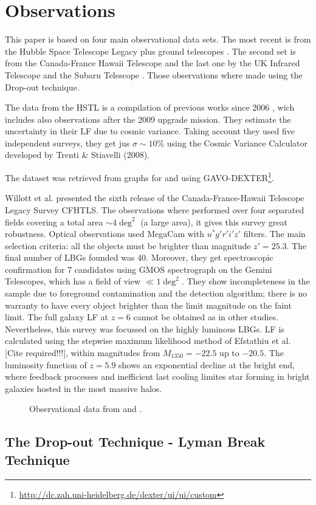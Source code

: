 \section{Observations}

This paper is based on four main observational data sets. The most recent is
from the Hubble Space Telescope Legacy plus ground telescopes \citep{bouwens14}.
The second set is from the Canada-France Hawaii Telescope\citep{willott13} and
the last one by the UK Infrared Telescope and the Subaru Telescope
\cite{mclure09}. Those observations where made using the Drop-out technique.

The data from the HSTL is a compilation of previous works since
2006 \citep{bouwens06}, wich includes also observations after the 2009
upgrade mission\citep{bouwens12}. They estimate the uncertainty in their LF due
to cosmic variance. Taking account they used five independent surveys, they get
jus $\sigma\sim 10\%$\citep{bouwens14} using the Cosmic Variance Calculator
developed by Trenti \& Stiavelli (2008).



The dataset was retrieved from graphs for \cite{bouwens14} and \cite{mclure09} 
using
GAVO-DEXTER\footnote{\url{http://dc.zah.uni-heidelberg.de/dexter/ui/ui/custom}}.




Willott et al. \cite{willott13} presented the sixth release of the Canada-France-Hawaii Telescope Legacy Survey CFHTLS. The observations where performed over four separated fields covering a total area $\sim 4 \deg^2$ (a large area), it gives this survey great robustness.
Optical observations used MegaCam with $u^* g' r' i' z'$ filters. The main selection criteria: all the objects must be brighter than magnitude $z' = 25.3$. The final number of LBGs founded was 40. Moreover, they get spectroscopic confirmation for 7 candidates using GMOS spectrograph on the Gemini Telescopes, which has a field of view $\ll 1 \deg^2$. They show incompleteness in the sample due to foreground contamination and the detection algorithm; there is no warranty to have every object brighter than the limit magnitude on the faint limit. The full galaxy LF at $z=6$ cannot be obtained as in other studies. Nevertheless, this survey was focussed on the highly luminous LBGs. LF is calculated using the stepwise maximum likelihood method of Efstathiu et al. [Cite required!!!], within magnitudes from $M_{1350} = -22.5$ up to $-20.5$. The luminosity function of $z=5.9$ shows an exponential decline at the bright end, where feedback processes and inefficient last cooling limites star forming in bright galaxies hosted in the most massive halos.






\begin{figure}
\caption{Observational data from \cite{bouwens14,mclure09}and \cite{willott13}.}
\label{graph_observational_data}
\end{figure}

     
\subsection{The Drop-out Technique - Lyman Break Technique}

\cite{steidel03}